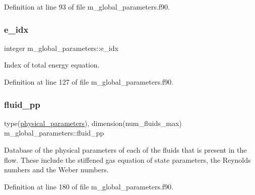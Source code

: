 Definition at line 93 of file m\+\_\+global\+\_\+parameters.\+f90.

\mbox{\label{namespacem__global__parameters_ac6ef72ca6aa7a22e60c864df25559892}} 
\subsubsection{\texorpdfstring{e\+\_\+idx}{e\_idx}}
{\footnotesize\ttfamily integer m\+\_\+global\+\_\+parameters\+::e\+\_\+idx}



Index of total energy equation. 



Definition at line 127 of file m\+\_\+global\+\_\+parameters.\+f90.

\mbox{\label{namespacem__global__parameters_a7297abec8863ecabf95e24ebdae46a17}} 
\subsubsection{\texorpdfstring{fluid\+\_\+pp}{fluid\_pp}}
{\footnotesize\ttfamily type(\hyperlink{structm__derived__types_1_1physical__parameters}{physical\+\_\+parameters}), dimension(num\+\_\+fluids\+\_\+max) m\+\_\+global\+\_\+parameters\+::fluid\+\_\+pp}



Database of the physical parameters of each of the fluids that is present in the flow. These include the stiffened gas equation of state parameters, the Reynolds numbers and the Weber numbers. 



Definition at line 180 of file m\+\_\+global\+\_\+parameters.\+f90.

\mbox{\label{namespacem__global__parameters_a3bde8cf1ea00471fcd005219c55e824e}} 

